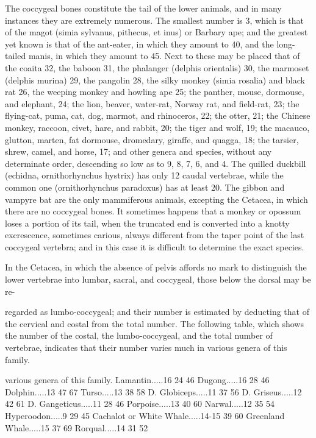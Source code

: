 \documentclass{article}
\begin{document}
The coccygeal bones constitute the tail of the lower animals, and in many instances they are extremely numerous. The smallest number is 3, which is that of the magot (simia sylvanus, pithecus, et inus) or Barbary ape; and the greatest yet known is that of the ant-eater, in which they amount to 40, and the long-tailed manis, in which they amount to 45. Next to these may be placed that of the coaita 32, the baboon 31, the phalanger (delphis orientalis) 30, the marmoset (delphis murina) 29, the pangolin 28, the silky monkey (simia rosalia) and black rat 26, the weeping monkey and howling ape 25; the panther, mouse, dormouse, and elephant, 24; the lion, beaver, water-rat, Norway rat, and field-rat, 23; the flying-cat, puma, cat, dog, marmot, and rhinoceros, 22; the otter, 21; the Chinese monkey, raccoon, civet, hare, and rabbit, 20; the tiger and wolf, 19; the macauco, glutton, marten, fat dormouse, dromedary, giraffe, and quagga, 18; the tarsier, shrew, camel, and horse, 17; and other genera and species, without any determinate order, descending so low as to 9, 8, 7, 6, and 4. The quilled duckbill (echidna, ornithorhynchus hystrix) has only 12 caudal vertebrae, while the common one (ornithorhynchus paradoxus) has at least 20. The gibbon and vampyre bat are the only mammiferous animals, excepting the Cetacea, in which there are no coccygeal bones. It sometimes happens that a monkey or opossum loses a portion of its tail, when the truncated end is converted into a knotty excrescence, sometimes carious, always different from the taper point of the last coccygeal vertebra; and in this case it is difficult to determine the exact species.

In the Cetacea, in which the absence of pelvis affords
no mark to distinguish the lower vertebrae into lumbar,
sacral, and coccygeal, those below the dorsal may be re-

regarded as lumbo-coccygeal; and their number is estimated
by deducting that of the cervical and costal from the total
number. The following table, which shows the number
of the costal, the lumbo-coccygeal, and the total number
of vertebrae, indicates that their number varies much in
various genera of this family.

various genera of this family.
Lamantin.....16 24 46
Dugong.....16 28 46
Dolphin.....13 47 67
Turso.....13 38 58
D. Globiceps.....11 37 56
D. Griseus.....12 42 61
D. Gangeticus.....11 28 46
Porpoise.....13 40 60
Narwal.....12 35 54
Hyperoodon.....9 29 45
Cachalot or White
Whale.....14-15 39 60
Greenland Whale.....15 37 69
Rorqual.....14 31 52
\end{document}
